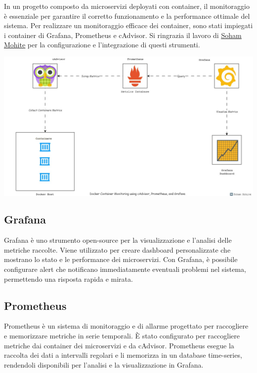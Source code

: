 In un progetto composto da microservizi deployati con container, il monitoraggio è essenziale per garantire il corretto funzionamento e la performance ottimale del sistema. Per realizzare un monitoraggio efficace dei container, sono stati impiegati i container di Grafana, Prometheus e cAdvisor.
Si ringrazia il lavoro di \href{https://medium.com/@sohammohite/docker-container-monitoring-with-cadvisor-prometheus-and-grafana-using-docker-compose-b47ec78efbc}{\underline{Soham Mohite}} per la configurazione e l'integrazione di questi strumenti.

\includegraphics[width=14cm]{report/img/monitor_schema.jpg}\\[0.5cm]

\subsection{Grafana}

Grafana è uno strumento open-source per la visualizzazione e l'analisi delle metriche raccolte. Viene utilizzato per creare dashboard personalizzate che mostrano lo stato e le performance dei microservizi. Con Grafana, è possibile configurare alert che notificano immediatamente eventuali problemi nel sistema, permettendo una risposta rapida e mirata.

\subsection{Prometheus}

Prometheus è un sistema di monitoraggio e di allarme progettato per raccogliere e memorizzare metriche in serie temporali. È stato configurato per raccogliere metriche dai container dei microservizi e da cAdvisor. Prometheus esegue la raccolta dei dati a intervalli regolari e li memorizza in un database time-series, rendendoli disponibili per l'analisi e la visualizzazione in Grafana.


